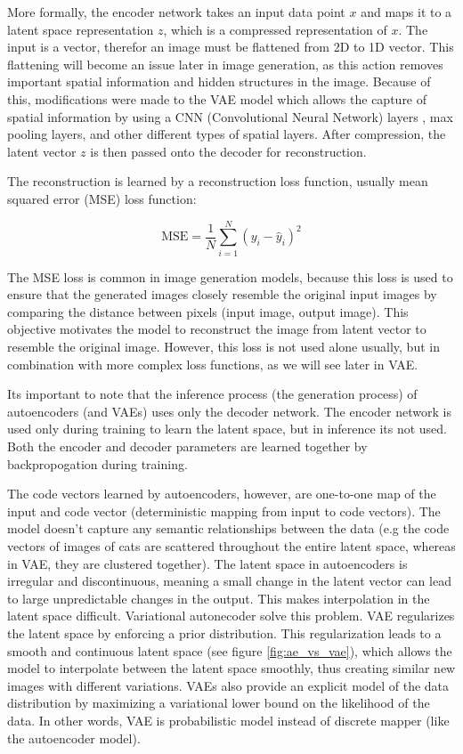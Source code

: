 More formally, the encoder network takes an input data point $x$ and maps it to a latent space representation $z$, which is a compressed representation of $x$. The input is a vector, therefor an image must be flattened from 2D to 1D vector. This flattening will become an issue later in image generation, as this action removes important spatial information and hidden structures in the image. Because of this, modifications were made to the VAE model which allows the capture of spatial information by using a CNN (Convolutional Neural Network) \cite{cnn} layers \cite{vae_cnn_example}, max pooling layers, and other different types of spatial layers. After compression, the latent vector $z$ is then passed onto the decoder for reconstruction. 

The reconstruction is learned by a reconstruction loss function, usually mean squared error (MSE) loss function:

\begin{equation}
    \text{MSE} = \frac{1}{N} \sum_{i=1}^{N} (y_i - \hat{y}_i)^2
\label{eq:mse}
\end{equation}

The MSE loss is common in image generation models, because this loss is used to ensure that the generated images closely resemble the original input images by comparing the distance between pixels (input image, output image). This objective motivates the model to reconstruct the image from latent vector to resemble the original image. However, this loss is not used alone usually, but in combination with more complex loss functions, as we will see later in VAE.

Its important to note that the inference process (the generation process) of autoencoders (and VAEs) uses only the decoder network. The encoder network is used only during training to learn the latent space, but in inference its not used. Both the encoder and decoder parameters are learned together by backpropogation during training.

The code vectors learned by autoencoders, however, are one-to-one map of the input and code vector (deterministic mapping from input to code vectors). The model doesn't capture any semantic relationships between the data (e.g the code vectors of images of cats are scattered throughout the entire latent space, whereas in VAE, they are clustered together). The latent space in autoencoders is irregular and discontinuous, meaning a small change in the latent vector can lead to large unpredictable changes in the output. This makes interpolation in the latent space difficult. Variational autonecoder solve this problem. VAE regularizes the latent space by enforcing a prior distribution. This regularization leads to a smooth and continuous latent space (see figure \ref{fig:ae_vs_vae}), which allows the model to interpolate between the latent space smoothly, thus creating similar new images with different variations. VAEs also provide an explicit model of the data distribution by maximizing a variational lower bound on the likelihood of the data. In other words, VAE is probabilistic model instead of discrete mapper (like the autoencoder model).

